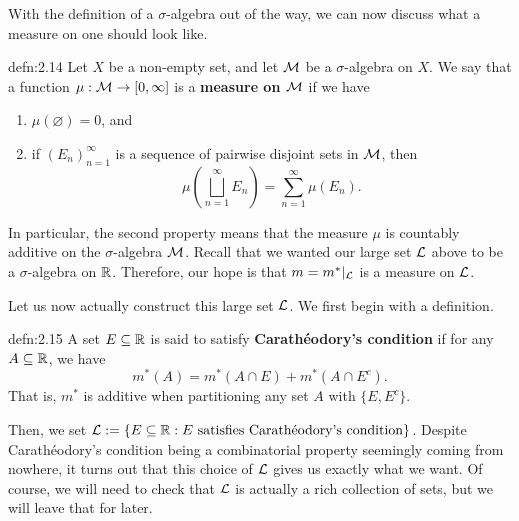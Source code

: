 With the definition of a $\sigma$-algebra out of the way, we can now
discuss what a measure on one should look like. 

\begin{defn}{defn:2.14}
    Let $X$ be a non-empty set, and let ${\cal M}$ be a $\sigma$-algebra on $X$. 
    We say that a function $\mu : {\cal M} \to [0, \infty]$ is a 
    {\bf measure on ${\cal M}$} if we have 
    \begin{enumerate}[(1)]
        \item $\mu(\varnothing) = 0$, and 
        \item if $(E_n)_{n=1}^\infty$ is a sequence of pairwise disjoint sets
        in ${\cal M}$, then 
        \[ \mu\!\left( \bigsqcup_{n=1}^\infty E_n \right) = \sum_{n=1}^\infty 
        \mu(E_n). \] 
    \end{enumerate}
\end{defn}

In particular, the second property means that the measure $\mu$ is 
countably additive on the $\sigma$-algebra ${\cal M}$. Recall that we wanted 
our large set ${\cal L}$ above to be a $\sigma$-algebra on $\mathbb{R}$. Therefore, 
our hope is that $m = m^*|_{\cal L}$ is a measure on ${\cal L}$.

Let us now actually construct this large set ${\cal L}$. We first begin 
with a definition. 

\begin{defn}{defn:2.15}
    A set $E \subseteq \mathbb{R}$ is said to satisfy {\bf Carathéodory's condition} 
    if for any $A \subseteq \mathbb{R}$, we have 
    \[ m^*(A) = m^*(A \cap E) + m^*(A \cap E^c). \] 
    That is, $m^*$ is additive when partitioning any set $A$ with 
    $\{E, E^c\}$. 
\end{defn}

Then, we set ${\cal L} := \{E \subseteq \mathbb{R} : E \text { satisfies 
Carathéodory's condition}\}$. Despite Carathéodory's condition being a 
combinatorial property seemingly coming from nowhere, it turns out that this 
choice of ${\cal L}$ gives us exactly what we want. Of course, we will need 
to check that ${\cal L}$ is actually a rich collection of sets, but we will 
leave that for later. 

